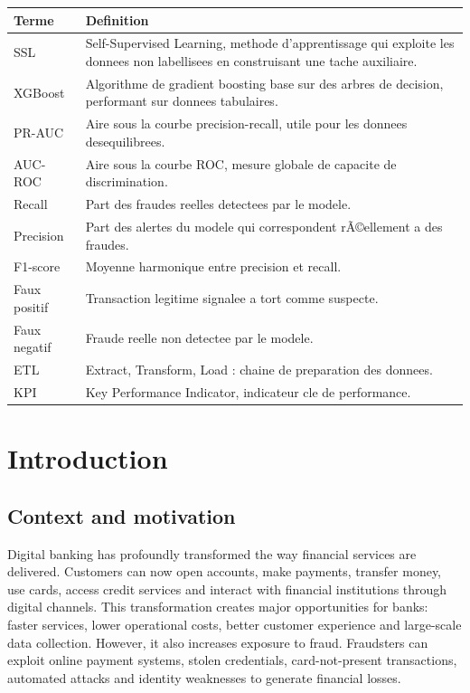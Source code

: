 ﻿\documentclass[12pt,a4paper]{report}
\begin{document}
\begin{longtable}{p{3cm}p{11cm}}
\toprule
\textbf{Terme} & \textbf{Definition} \\
\midrule
SSL & Self-Supervised Learning, methode d'apprentissage qui exploite les donnees non labellisees en construisant une tache auxiliaire. \\
XGBoost & Algorithme de gradient boosting base sur des arbres de decision, performant sur donnees tabulaires. \\
PR-AUC & Aire sous la courbe precision-recall, utile pour les donnees desequilibrees. \\
AUC-ROC & Aire sous la courbe ROC, mesure globale de capacite de discrimination. \\
Recall & Part des fraudes reelles detectees par le modele. \\
Precision & Part des alertes du modele qui correspondent rÃ©ellement a des fraudes. \\
F1-score & Moyenne harmonique entre precision et recall. \\
Faux positif & Transaction legitime signalee a tort comme suspecte. \\
Faux negatif & Fraude reelle non detectee par le modele. \\
ETL & Extract, Transform, Load : chaine de preparation des donnees. \\
KPI & Key Performance Indicator, indicateur cle de performance. \\
\bottomrule
\end{longtable}

\chapter{Introduction}

\section{Context and motivation}

Digital banking has profoundly transformed the way financial services are delivered. Customers can now open accounts, make payments, transfer money, use cards, access credit services and interact with financial institutions through digital channels. This transformation creates major opportunities for banks: faster services, lower operational costs, better customer experience and large-scale data collection. However, it also increases exposure to fraud. Fraudsters can exploit online payment systems, stolen credentials, card-not-present transactions, automated attacks and identity weaknesses to generate financial losses.
\end{document}
